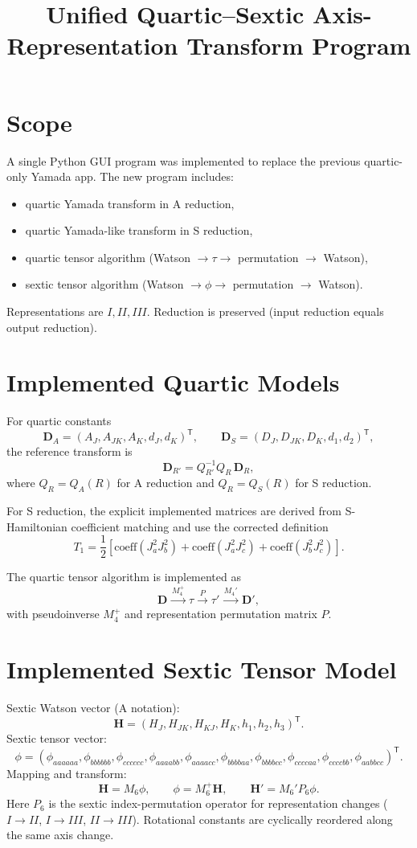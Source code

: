 \documentclass[11pt]{article}
\title{Unified Quartic--Sextic Axis-Representation Transform Program}
\author{}
\date{}
\begin{document}
\maketitle

\section*{Scope}
A single Python GUI program was implemented to replace the previous quartic-only Yamada app. The new program includes:
\begin{itemize}
\item quartic Yamada transform in A reduction,
\item quartic Yamada-like transform in S reduction,
\item quartic tensor algorithm (Watson $\rightarrow \tau \rightarrow$ permutation $\rightarrow$ Watson),
\item sextic tensor algorithm (Watson $\rightarrow \phi \rightarrow$ permutation $\rightarrow$ Watson).
\end{itemize}

Representations are $I,II,III$. Reduction is preserved (input reduction equals output reduction).

\section*{Implemented Quartic Models}
For quartic constants
\[
\mathbf D_A=(A_J,A_{JK},A_K,d_J,d_K)^\mathsf T,
\qquad
\mathbf D_S=(D_J,D_{JK},D_K,d_1,d_2)^\mathsf T,
\]
the reference transform is
\[
\mathbf D_{R'}=Q_{R'}^{-1}Q_R\,\mathbf D_R,
\]
where $Q_R=Q_A(R)$ for A reduction and $Q_R=Q_S(R)$ for S reduction.

For S reduction, the explicit implemented matrices are derived from S-Hamiltonian coefficient matching and use the corrected definition
\[
T_1=\frac12\left[\mathrm{coeff}(J_a^2J_b^2)+\mathrm{coeff}(J_a^2J_c^2)+\mathrm{coeff}(J_b^2J_c^2)\right].
\]

The quartic tensor algorithm is implemented as
\[
\mathbf D \xrightarrow{\,M_4^+\,} \tau \xrightarrow{\,P\,} \tau' \xrightarrow{\,M_4'\,} \mathbf D',
\]
with pseudoinverse $M_4^+$ and representation permutation matrix $P$.

\section*{Implemented Sextic Tensor Model}
Sextic Watson vector (A notation):
\[
\mathbf H=(H_J,H_{JK},H_{KJ},H_K,h_1,h_2,h_3)^\mathsf T.
\]
Sextic tensor vector:
\[
\phi=(\phi_{aaaaaa},\phi_{bbbbbb},\phi_{cccccc},\phi_{aaaabb},\phi_{aaaacc},\phi_{bbbbaa},\phi_{bbbbcc},\phi_{ccccaa},\phi_{ccccbb},\phi_{aabbcc})^\mathsf T.
\]
Mapping and transform:
\[
\mathbf H=M_6\phi,
\qquad
\phi=M_6^+\mathbf H,
\qquad
\mathbf H' = M_6' P_6 \phi.
\]
Here $P_6$ is the sextic index-permutation operator for representation changes ($I\to II$, $I\to III$, $II\to III$). Rotational constants are cyclically reordered along the same axis change.
\end{document}
